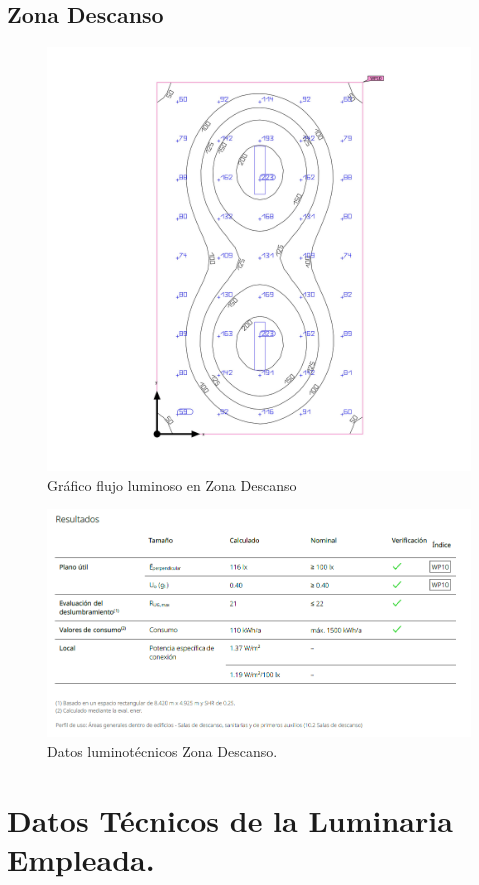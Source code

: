\documentclass[../main.tex]{subfiles}
\begin{document}
\subsection{Zona Descanso}
\begin{figure}[H]
    \centering
    \includegraphics[width=0.5\linewidth]{Imagenes/Iluminacion Zona Descanso.png}
    \caption{Gráfico flujo luminoso en Zona Descanso}
\end{figure}

\begin{figure}[H]
    \centering
    \includegraphics[width=0.75\linewidth]{Imagenes/Resultados Iluminacion Zona Descanso.png}
    \caption{Datos luminotécnicos Zona Descanso.}
\end{figure}

\section{Datos Técnicos de la Luminaria Empleada.}



\end{document}
